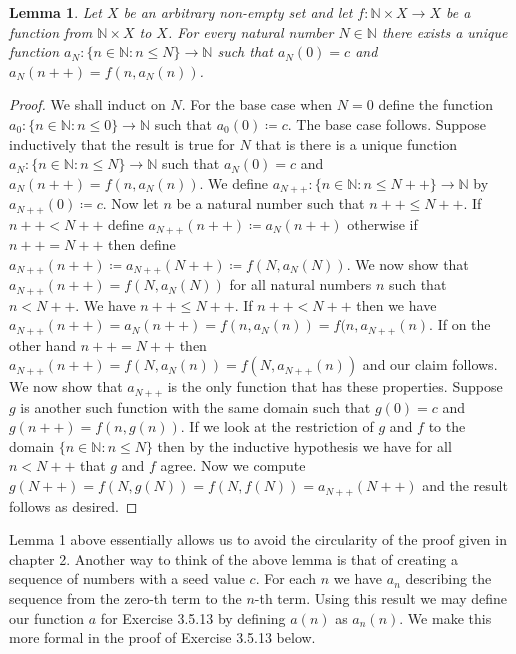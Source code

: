 \documentclass{article}
\newtheorem{lemma}{Lemma}
\begin{document}
	\begin{lemma}
		Let $X$ be an arbitrary non-empty set and let $f:\mathbb{N} \times X \rightarrow X$ be a function from $\mathbb{N} \times X$ to $X$. For every natural number $N \in \mathbb{N}$ there exists a unique function $a_{N}:\{n \in \mathbb{N}:n \leq N\} \rightarrow \mathbb{N}$ such that $a_{N}(0) = c$ and $a_{N}(n++) = f(n,a_{N}(n))$.
	\end{lemma}
	
	\begin{proof}
		We shall induct on $N$. For the base case when $N = 0$ define the function $a_{0}:\{n \in \mathbb{N}:n \leq 0\} \rightarrow \mathbb{N}$ such that $a_{0}(0) \coloneqq c$. The base case follows. Suppose inductively that the result is true for $N$ that is there is a unique function $a_{N}:\{n \in \mathbb{N}:n \leq N\} \rightarrow \mathbb{N}$
		such that $a_{N}(0) = c$ and $a_{N}(n++) = f(n,a_{N}(n))$. We define  $a_{N++}:\{n \in \mathbb{N}:n \leq N++\} \rightarrow \mathbb{N}$ by $a_{N++}(0) \coloneqq c$. Now let $n$ be a natural number such that $n++ \leq N++$. If $n++ < N++$ define $a_{N++}(n++) \coloneqq
		a_{N}(n++)$ otherwise if $n++ = N++$ then define  $a_{N++}(n++) \coloneqq a_{N++}(N++) \coloneqq f(N,a_{N}(N))$. We now show that $a_{N++}(n++) =  f(N,a_{N}(N))$ for all natural numbers $n$ such that $n < N++$. We have $n++ \leq N++$. If $n++ < N++$ then we have  $a_{N++}(n++) = a_{N}(n++) = f(n, a_{N}(n)) = f(n, a_{N++}(n)$. If on the other hand $n++ = N++$ then $a_{N++}(n++) = f(N, a_{N}(n))= f(N, a_{N++}(n))$ and our claim follows. We now show that $a_{N++}$ is the only function that has these properties. Suppose $g$ is another such function with the same domain such that $g(0) = c$ and
		$g(n++) = f(n,g(n))$. If we look at the restriction of $g$ and $f$ to the domain $\{n \in \mathbb{N}:n \leq N\}$ then by the inductive hypothesis we have for all $n < N++$ that $g$ and $f$ agree. Now we compute $g(N++) = f(N, g(N)) = f(N, f(N)) = a_{N++}(N++)$ and the result follows as desired.
	\end{proof}
	
	\noindent Lemma 1 above essentially allows us to avoid the circularity of the proof given in chapter 2. Another way to think of the above lemma is that of creating a sequence of numbers with a seed value $c$. For each $n$ we have $a_{n}$ describing the sequence from the zero-th term to the $n$-th term. Using this result we may define our function $a$ for Exercise 3.5.13 by defining $a(n)$ as $a_{n}(n)$. We make this more formal in the proof of Exercise 3.5.13 below.
	
\end{document}
